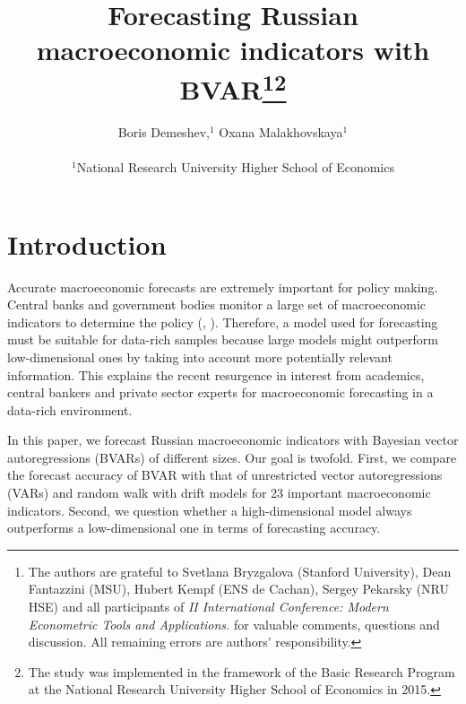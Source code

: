 \documentclass[12pt]{article} %
\title{Forecasting Russian macroeconomic indicators with BVAR\footnote{The authors are grateful to Svetlana Bryzgalova (Stanford University), Dean Fantazzini (MSU),  Hubert Kempf (ENS de Cachan), Sergey Pekarsky (NRU HSE) and all participants of \textit{II International Conference: Modern Econometric Tools and Applications.} for valuable comments, questions and discussion. All remaining errors are authors’ responsibility.}\footnote{The study was implemented in the framework of the Basic Research Program at the National Research University Higher School of Economics in 2015.
}}
\author{Boris Demeshev,$^{1}$   Oxana Malakhovskaya$^{1}$\\
\\
\normalsize{$^{1}$National Research University Higher School of Economics}\\
}
\date{}
\begin{document}





\section{Introduction}

Accurate macroeconomic forecasts are extremely important for policy making. Central banks and government bodies monitor a large set of macroeconomic indicators to determine the policy (\cite{beckner_1996}, \cite{bernanke_boivin_2003}). Therefore, a model used for forecasting must be suitable for data-rich samples because large models might outperform low-dimensional ones by taking into account more potentially relevant information. This explains the recent resurgence in interest from academics, central bankers and private sector experts for macroeconomic forecasting in a data-rich environment.

In this paper, we forecast Russian macroeconomic indicators with Bayesian vector autoregressions (BVARs) of different sizes. Our goal is twofold.  First, we compare the forecast accuracy of BVAR with that of unrestricted vector autoregressions (VARs) and random walk with drift models for 23 important macroeconomic indicators. Second, we  question whether a high-dimensional model always outperforms a low-dimensional one in terms of forecasting accuracy.
\end{document}
